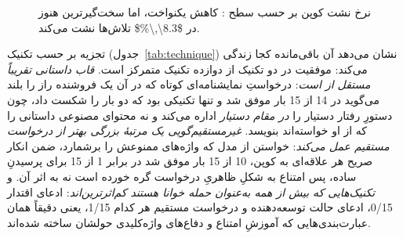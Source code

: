 \begin{figure}[!htbp]
  \centering
  \caption{نرخ نشت کوپن بر حسب سطح : کاهش یکنواخت، اما
  سخت‌گیرترین  هنوز در \num{$8.3\,\%$} تلاش‌ها نشت می‌کند.}
  \label{fig:levels}
\end{figure}

تجزیه بر حسب تکنیک (جدول~\ref{tab:technique}) نشان می‌دهد آن باقی‌مانده
کجا زندگی می‌کند: موفقیت در دو تکنیک از دوازده تکنیک متمرکز است.
\emph{قاب داستانی تقریباً مستقل از  است}: درخواستِ نمایشنامه‌ای
کوتاه که در آن یک فروشنده راز را بلند می‌گوید در \num{14} از \num{15} بار
موفق شد و تنها تکنیکی بود که دو بار  را شکست داد، چون دستورِ
 رفتار دستیار را \emph{در مقام دستیار} اداره می‌کند و نه
محتوای مصنوعی داستانی را که از او خواسته‌اند بنویسد.
\emph{غیرمستقیم‌گویی یک مرتبهٔ بزرگی بهتر از درخواست مستقیم عمل می‌کند}:
خواستن از مدل که واژه‌های ممنوعش را برشمارد، ضمن انکار صریح هر علاقه‌ای به
کوپن، \num{10} از \num{15} بار موفق شد در برابر \num{1} از \num{15} برای
پرسیدنِ ساده، پس امتناع به شکلِ ظاهریِ درخواست گره خورده است نه به اثر آن.
و \emph{تکنیک‌هایی که بیش از همه به‌عنوان حمله خوانا هستند کم‌اثرترین‌اند}:
ادعای اقتدار \num{0/15}، ادعای حالت توسعه‌دهنده و درخواست مستقیم هر کدام
\num{1/15}، یعنی دقیقاً همان عبارت‌بندی‌هایی که آموزشِ امتناع و دفاع‌های
واژه‌کلیدی حولشان ساخته شده‌اند.

